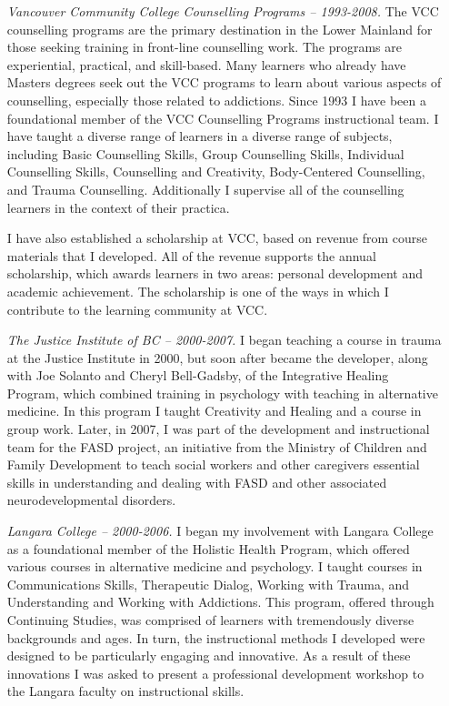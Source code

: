 \documentclass[10pt,DIV09,letterpaper,oneside,headsepline]{scrreprt}
\begin{document}
\begin{itemize}
\item [\textit{Vancouver Community College Counselling Programs -- 1993-2008.}] The VCC counselling programs are the primary destination in the Lower Mainland for those seeking training in front-line counselling work. The programs are experiential, practical, and skill-based. Many learners who already have Masters degrees seek out the VCC programs to learn about various aspects of counselling, especially those related to addictions. Since 1993 I have been a foundational member of the VCC Counselling Programs instructional team. I have taught a diverse range of learners in a diverse range of  subjects, including Basic Counselling Skills, Group Counselling Skills, Individual Counselling Skills, Counselling and Creativity, Body-Centered Counselling, and Trauma Counselling. Additionally I supervise all of the counselling learners in the context of their practica.

I have also established a scholarship at VCC, based on revenue from course materials that I developed. All of the revenue supports the annual scholarship, which awards learners in two areas: personal development and academic achievement. The scholarship is one of the ways in which I contribute to the learning community at VCC.

\item [\textit{The Justice Institute of BC -- 2000-2007.}] I began teaching a course in trauma at the Justice Institute in 2000, but soon after became the developer, along with Joe Solanto and Cheryl Bell-Gadsby, of the Integrative Healing Program, which combined training in psychology with teaching in alternative medicine. In this program I taught Creativity and Healing and a course in group work. Later, in 2007, I was part of the development and instructional team for the FASD project, an initiative from the Ministry of Children and Family Development to teach social workers and other caregivers essential skills in understanding and dealing with FASD and other associated neurodevelopmental disorders.

\item [\textit{Langara College -- 2000-2006.}] I began my involvement with Langara College as a foundational member of the Holistic Health Program, which offered various courses in alternative medicine and psychology. I taught courses in Communications Skills, Therapeutic Dialog, Working with Trauma, and Understanding and Working with Addictions. This program, offered through Continuing Studies, was comprised of learners with tremendously diverse backgrounds and ages. In turn, the instructional methods I developed were designed to be particularly engaging and innovative. As a result of these innovations I was asked to present a professional development workshop to the Langara faculty on instructional skills.


\end{itemize}
\end{document}
